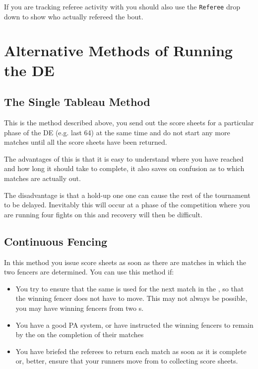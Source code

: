 \documentclass[a4paper,11pt]{memoir}
\begin{document}
If you are tracking referee activity with \fencingtime{} you should also use the \texttt{Referee} drop down to show who actually refereed the bout.

\section{Alternative Methods of Running the DE}

\subsection{The Single Tableau Method}

This is the method described above, you send out the score sheets for a particular phase of the DE (e.g. last 64) at the same time and do not start any more matches until all the score sheets have been returned.

The advantages of this is that it is easy to understand where you have reached and how long it should take to complete, it also saves on confusion as to which matches are actually out.

The disadvantage is that a hold-up one one  can cause the rest of the tournament to be delayed. Inevitably this will occur at a phase of the competition where you are running four fights on this  and recovery will then be difficult.

\subsection{Continuous Fencing}

In this method you issue score sheets as soon as there are matches in which the two fencers are determined. You can use this method if:

\begin{itemize}
 \item You try to ensure that the same  is used for the next match in the , so that the winning fencer does not have to move. This may not always be possible, you may have winning fencers from two s.
 \item You have a good PA system, or have instructed the winning fencers to remain by the  on the completion of their matches
 \item You have briefed the referees to return each match as soon as it is complete or, better, ensure that your runners move from  to  collecting score sheets. 
\end{itemize}
\end{document}

